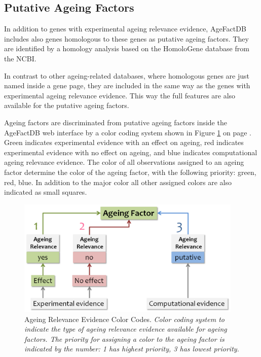 \documentclass[12pt,a4paper,notitlepage,twoside]{report}
\begin{document}
\subsection{Putative Ageing Factors}
\label{sec:putative_ageing_factors}
In addition to genes with experimental ageing relevance evidence, AgeFactDB includes also genes homologous to these genes as putative ageing factors. They are identified by a homology analysis based on the HomoloGene database from the NCBI.

In contrast to other ageing-related databases, where homologous genes are just named inside a gene page, they are included in the same way as the genes with experimental ageing relevance evidence. This way the full features are also available for the putative ageing factors. 

Ageing factors are discriminated from putative ageing factors inside the AgeFactDB web interface by a color coding system shown in Figure \ref{fig:ageing_relevance_evidence} on page \pageref{fig:ageing_relevance_evidence}. Green indicates experimental evidence with an effect on ageing, red indicates experimental evidence with no effect on ageing, and blue indicates computational ageing relevance evidence. The color of all observations assigned to an ageing factor determine the color of the ageing factor, with the following priority:  green, red, blue. In addition to the major color all other assigned colors are also indicated as small squares.

 \begin{figure}[!ht]
      \includegraphics[width=0.96\textwidth]{data/ageing_relevance_evidence.png}
  \caption[Ageing Relevance Evidence Color Codes]{Ageing Relevance Evidence Color Codes. 
  \newline \textit{Color coding system to indicate the type of ageing relevance evidence available for ageing factors. The priority for assigning a color to the ageing factor is indicated by the number: 1 has highest priority, 3 has lowest priority.}
      \label{fig:ageing_relevance_evidence}
      }
\end{figure}
\end{document}
